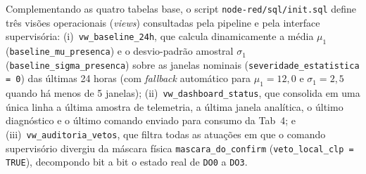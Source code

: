 Complementando as quatro tabelas base, o script \texttt{node-red/sql/init.sql} define três visões operacionais (\textit{views}) consultadas pela pipeline e pela interface supervisória: (i)~\texttt{vw\_baseline\_24h}, que calcula dinamicamente a média $\mu_1$ (\texttt{baseline\_mu\_presenca}) e o desvio-padrão amostral $\sigma_1$ (\texttt{baseline\_sigma\_presenca}) sobre as janelas nominais (\texttt{severidade\_estatistica = 0}) das últimas 24 horas (com \textit{fallback} automático para $\mu_1 = 12{,}0$ e $\sigma_1 = 2{,}5$ quando há menos de 5 janelas); (ii)~\texttt{vw\_dashboard\_status}, que consolida em uma única linha a última amostra de telemetria, a última janela analítica, o último diagnóstico e o último comando enviado para consumo da Tab~4; e (iii)~\texttt{vw\_auditoria\_vetos}, que filtra todas as atuações em que o comando supervisório divergiu da máscara física \texttt{mascara\_do\_confirm} (\texttt{veto\_local\_clp = TRUE}), decompondo bit a bit o estado real de \texttt{DO0} a \texttt{DO3}.
